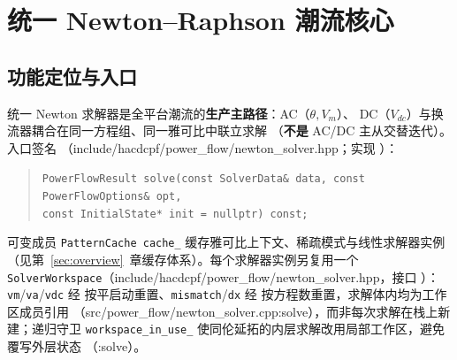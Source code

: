 \section{统一 Newton--Raphson 潮流核心}\label{sec:newton}

\subsection{功能定位与入口}


统一 Newton 求解器是全平台潮流的\textbf{生产主路径}：AC（$\theta,V_m$）、
DC（$V_{dc}$）与换流器耦合在同一方程组、同一雅可比中联立求解
（\textbf{不是} AC/DC 主从交替迭代）。入口签名
（include/hacdcpf/power\_flow/newton\_solver.hpp；实现 ）：
\begin{quote}\footnotesize
\texttt{PowerFlowResult solve(const SolverData\& data, const PowerFlowOptions\& opt,\\
\hspace*{2em}const InitialState* init = nullptr) const;}
\end{quote}
可变成员 \texttt{PatternCache cache\_} 缓存雅可比上下文、稀疏模式与线性求解器实例
（见第~\ref{sec:overview}~章缓存体系）。每个求解器实例另复用一个
\texttt{SolverWorkspace}（include/hacdcpf/power\_flow/newton\_solver.hpp，接口
）：\texttt{vm}/\texttt{va}/\texttt{vdc}
经  按平启动重置、\texttt{mismatch}/\texttt{dx} 经
 按方程数重置，求解体内均为工作区成员引用
（src/power\_flow/newton\_solver.cpp:solve），而非每次求解在栈上新建；递归守卫
\texttt{workspace\_in\_use\_} 使同伦延拓的内层求解改用局部工作区，避免覆写外层状态
（:solve）。

